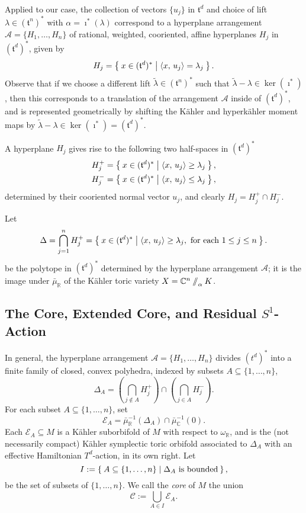 \documentclass{amsart}
\newcommand{\w}{\omega}
\newcommand{\RR}{\mathbb{R}}
\newcommand{\CC}{\mathbb{C}}
\newcommand{\mcA}{\mathcal{A}}
\newcommand{\mcC}{\mathcal{C}}
\newcommand{\mcE}{\mathcal{E}}
\newcommand{\mft}{\mathfrak{t}}
\newcommand{\sslash}{\mathbin{/\mkern-6mu/}}
\begin{document}
	Applied to our case, the collection of vectors $\{u_{j}\}$ in $\mft^{d}$ and choice of lift $\lambda \in (\mft^{n})^{\ast}$ with $\alpha = \imath^{\ast}(\lambda)$ correspond to a hyperplane arrangement $\mcA = \{H_{1}, \ldots, H_{n}\}$ of rational, weighted, cooriented, affine hyperplanes $H_{j}$ in $(\mft^{d})^{\ast}$, given by
	\[
		H_{j} = \Set{ x \in (\mft^{d})^{\ast} | \langle x,\, u_{j} \rangle = \lambda_{j}}.
	\]
	Observe that if we choose a different lift $\tilde{\lambda} \in (\mft^{n})^{\ast}$ such that $\tilde{\lambda} -\lambda \in \ker(\imath^{\ast})$, then this corresponds to a translation of the arrangement $\mcA$ inside of $(\mft^{d})^{\ast}$, and is represented geometrically by shifting the K\"ahler and hyperk\"ahler moment maps by $\tilde{\lambda} - \lambda \in \ker(\imath^{\ast}) = (\mft^{d})^{\ast}$. 
	
	A hyperplane $H_{j}$ gives rise to the following two half-spaces in $(\mft^{d})^{\ast}$
	\begin{align*}
		H_{j}^{+} &= \Set{ x \in (\mft^{d})^{\ast} | \langle x,\, u_{j} \rangle \geq \lambda_{j} }, \\
		H_{j}^{-} &= \Set{ x \in (\mft^{d})^{\ast} | \langle x,\, u_{j} \rangle \leq \lambda_{j} },
	\end{align*}
	determined by their cooriented normal vector $u_{j}$, and clearly $H_{j} = H_{j}^{+} \cap H_{j}^{-}$.
	
	Let
	\[
		\Delta = \bigcap_{j=1}^{n} H_{j}^{+} = \Set{x \in (\mft^{d})^{\ast} | \langle x,\, u_{j} \rangle \geq \lambda_{j}, \text{ for each } 1 \leq j \leq n }.
	\]
	be the polytope in $(\mft^{d})^{\ast}$ determined by the hyperplane arrangement $\mcA$; it is the image under $\bar{\mu}_{\RR}$ of the K\"ahler toric variety $X = \CC^{n}\sslash_{\alpha} K$.
		
	\subsection{The Core, Extended Core, and Residual $S^{1}$-Action}
	
	In general, the hyperplane arrangement $\mcA = \{H_{1}, \ldots, H_{n} \}$ divides $(t^{d})^{\ast}$ into a finite family of closed, convex polyhedra, indexed by subsets $A \subseteq \{1,\ldots, n\}$,
	\[
	\Delta_{A} = \left(\bigcap_{j \not\in A} H_{j}^{+} \right) \cap \left(\bigcap_{j \in A} H_{j}^{-} \right).
	\]
	For each subset $A \subseteq \{1, \ldots, n\}$, set
	\[
	\mcE_{A} = \bar{\mu}_{\RR}^{-1}(\Delta_{A})\cap \bar{\mu}_{\CC}^{-1}(0).
	\]
	Each $\mcE_{A} \subseteq M$ is a K\"ahler suborbifold of $M$ with respect to $\w_{\RR}$, and is the (not necessarily compact) K\"ahler symplectic toric orbifold associated to $\Delta_{A}$ with an effective Hamiltonian $T^{d}$-action, in its own right. Let
	\[
		I := \Set{A \subseteq \{1, \ldots, n\} | \Delta_{A} \text{ is bounded}},
	\]
	be the set of subsets of $\{1, \ldots, n\}$. We call the \emph{core} of $M$ the union
	\[
		\mcC := \bigcup_{A \in I} \mcE_{A}.
	\]
	
\end{document}
